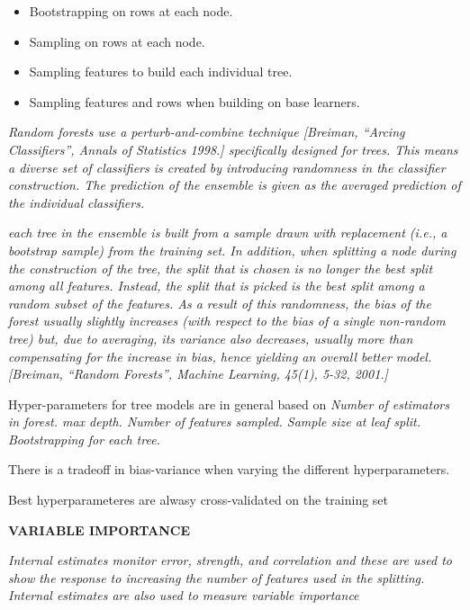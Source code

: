 	\begin{itemize}
		\item Bootstrapping on rows at each node.
		\item Sampling on rows at each node.
		\item Sampling features to build each individual tree.
		\item Sampling features and rows when building on base learners.
	\end{itemize}
	
	
	\textit{Random forests use a perturb-and-combine technique [Breiman, “Arcing Classifiers”, Annals of Statistics 1998.] specifically designed for trees. This means a diverse set of classifiers is created by introducing randomness in the classifier construction. The prediction of the ensemble is given as the averaged prediction of the individual classifiers.}
	
	\textit{each tree in the ensemble is built from a sample drawn with replacement (i.e., a bootstrap sample) from the training set. In addition, when splitting a node during the construction of the tree, the split that is chosen is no longer the best split among all features. Instead, the split that is picked is the best split among a random subset of the features. As a result of this randomness, the bias of the forest usually slightly increases (with respect to the bias of a single non-random tree) but, due to averaging, its variance also decreases, usually more than compensating for the increase in bias, hence yielding an overall better model. [Breiman, “Random Forests”, Machine Learning, 45(1), 5-32, 2001.] }
	
	
	Hyper-parameters for tree models are in general based on 
	\textit{Number of estimators in forest. max depth. Number of features sampled. Sample size at leaf split. Bootstrapping for each tree. }
	
	There is a tradeoff in bias-variance when varying the different hyperparameters.
	
	Best hyperparameteres are alwasy cross-validated on the training set
	
	\textbf{VARIABLE IMPORTANCE}
	
	\textit{Internal estimates monitor error, strength, and correlation and these are used to show
		the response to increasing the number of features used in the splitting. Internal estimates are also used to measure variable importance}
